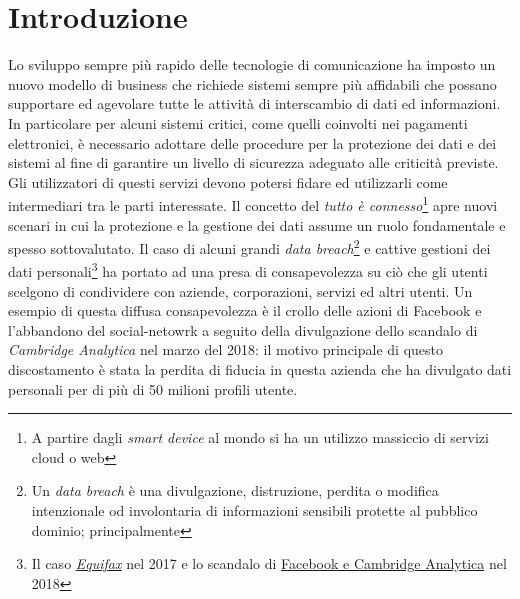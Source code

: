 \chapter{Introduzione}

Lo sviluppo sempre più rapido delle tecnologie di comunicazione ha imposto un nuovo modello di business che richiede sistemi sempre più affidabili che possano supportare ed agevolare tutte le attività di interscambio di dati ed informazioni. In particolare per alcuni sistemi critici, come quelli coinvolti nei pagamenti elettronici, è necessario adottare delle procedure per la protezione dei dati e dei sistemi al fine di garantire un livello di sicurezza adeguato alle criticità previste. Gli utilizzatori di questi servizi devono potersi fidare ed utilizzarli come intermediari tra le parti interessate.\newline\newline
Il concetto del \textit{tutto è connesso}\footnote{A partire dagli \textit{smart device} al mondo  si ha un utilizzo massiccio di servizi cloud o web} apre nuovi scenari in cui la protezione e la gestione dei dati assume un ruolo fondamentale e spesso sottovalutato. Il caso di alcuni grandi \textit{data breach}\footnote{Un \textit{data breach} è una divulgazione, distruzione, perdita o modifica intenzionale od involontaria di informazioni sensibili protette al pubblico dominio; principalmente } e cattive gestioni dei dati personali\footnote{Il caso \href{https://www.nytimes.com/2017/09/07/business/equifax-cyberattack.html}{\textit{Equifax}} nel 2017 e lo scandalo di \href{https://www.washingtonpost.com/business/understanding-the-facebook-cambridge-analytica-story-quicktake/2018/04/09/0f18d91c-3c1c-11e8-955b-7d2e19b79966_story.html}{Facebook e Cambridge Analytica} nel 2018} ha portato ad una presa di consapevolezza su ciò che gli utenti scelgono di condividere con aziende, corporazioni, servizi ed altri utenti.\newline
Un esempio di questa diffusa consapevolezza è il crollo delle azioni di Facebook e l'abbandono del social-netowrk a seguito della divulgazione dello scandalo di \textit{Cambridge Analytica} nel marzo del 2018: il motivo principale di questo discostamento è stata la perdita di fiducia in questa azienda che ha divulgato dati personali per di più di 50 milioni profili utente.\newline
